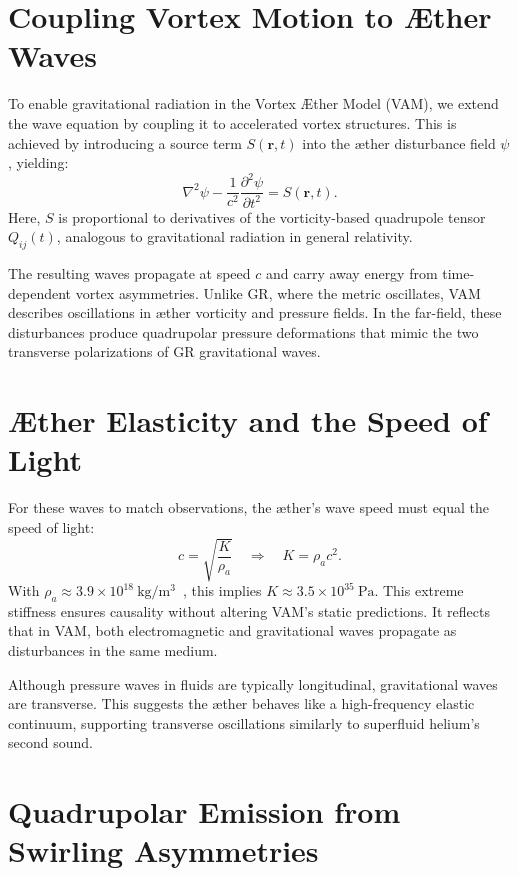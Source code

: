 \documentclass[a4paper, aps,preprint,superscriptaddress, 12pt]{revtex4}
\begin{document}
\section*{Coupling Vortex Motion to Æther Waves}

To enable gravitational radiation in the Vortex Æther Model (VAM), we extend the wave equation by coupling it to accelerated vortex structures. This is achieved by introducing a source term $S(\mathbf{r}, t)$ into the æther disturbance field $\psi$, yielding:
\begin{equation}
\nabla^2 \psi - \frac{1}{c^2} \frac{\partial^2 \psi}{\partial t^2} = S(\mathbf{r}, t).
\end{equation}
Here, $S$ is proportional to derivatives of the vorticity-based quadrupole tensor $Q_{ij}(t)$, analogous to gravitational radiation in general relativity.

The resulting waves propagate at speed $c$ and carry away energy from time-dependent vortex asymmetries. Unlike GR, where the metric oscillates, VAM describes oscillations in æther vorticity and pressure fields. In the far-field, these disturbances produce quadrupolar pressure deformations that mimic the two transverse polarizations of GR gravitational waves.

\section*{Æther Elasticity and the Speed of Light}

For these waves to match observations, the æther's wave speed must equal the speed of light:
\begin{equation}
c = \sqrt{\frac{K}{\rho_a}} \quad \Rightarrow \quad K = \rho_a c^2.
\end{equation}
With $\rho_a \approx 3.9 \times 10^{18}~\mathrm{kg/m^3}$~\cite{iskandarani2025VAM2}, this implies $K \approx 3.5 \times 10^{35}~\mathrm{Pa}$. This extreme stiffness ensures causality without altering VAM's static predictions. It reflects that in VAM, both electromagnetic and gravitational waves propagate as disturbances in the same medium.

Although pressure waves in fluids are typically longitudinal, gravitational waves are transverse. This suggests the æther behaves like a high-frequency elastic continuum, supporting transverse oscillations similarly to superfluid helium's second sound.

\section*{Quadrupolar Emission from Swirling Asymmetries}
\end{document}
